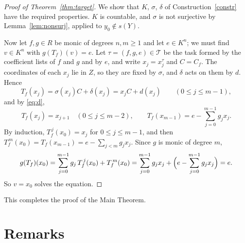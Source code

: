 \documentclass[11pt]{amsart}
\theoremstyle{plain}
\theoremstyle{definition}
\theoremstyle{remark}
\newcommand{\T}{\mathcal T}
\begin{document}
\begin{proof}[Proof of Theorem~\ref{thm:target}]
We show that $K$, $\sigma$, $\delta$ of Construction~\ref{constr} have the required properties. $K$ is countable, and $\sigma$ is not surjective by Lemma~\ref{lem:nonsurj}, applied to $y_0\notin s(Y)$.

Now let $f,g\in R$ be monic of degrees $n,m\ge1$ and let $e\in K^n$; we must find $v\in K^n$ with $g(T_f)(v)=e$. Let $\tau=(f,g,e)\in\T$ be the task formed by the coefficient lists of $f$ and $g$ and by $e$, and write $x_j=x^\tau_j$ and $C=C_f$. The coordinates of each $x_j$ lie in $Z$, so they are fixed by $\sigma$, and $\delta$ acts on them by $d$. Hence
\[
T_f(x_j)=\sigma(x_j)C+\delta(x_j)=x_jC+d(x_j)\qquad(0\le j\le m-1),
\]
and by \eqref{eq:d},
\[
T_f(x_j)=x_{j+1}\quad(0\le j\le m-2),\qquad T_f(x_{m-1})=e-\sum_{j=0}^{m-1}g_jx_j .
\]
By induction, $T_f^{\,j}(x_0)=x_j$ for $0\le j\le m-1$, and then $T_f^{\,m}(x_0)=T_f(x_{m-1})=e-\sum_{j<m}g_jx_j$. Since $g$ is monic of degree $m$,
\[
g(T_f)(x_0)=\sum_{j=0}^{m-1}g_j\,T_f^{\,j}(x_0)+T_f^{\,m}(x_0)=\sum_{j=0}^{m-1}g_jx_j+\Bigl(e-\sum_{j=0}^{m-1}g_jx_j\Bigr)=e .
\]
So $v=x_0$ solves the equation.
\end{proof}

This completes the proof of the Main Theorem.

\section{Remarks}\label{sec:remarks}
\end{document}
